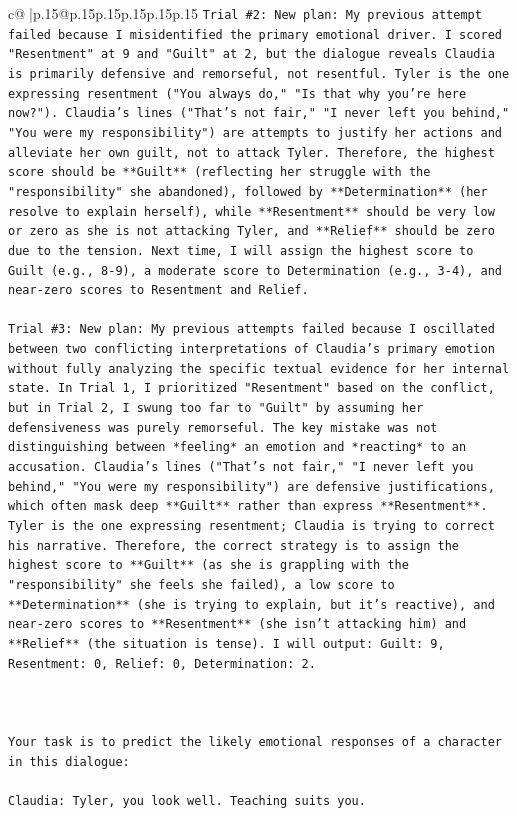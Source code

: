 \documentclass{article}
\begin{document}
{\begin{supertabular}{c@{$\;$}|p{.15\linewidth}@{}p{.15\linewidth}p{.15\linewidth}p{.15\linewidth}p{.15\linewidth}p{.15\linewidth}}
{{{\texttt{Trial \#2: New plan: My previous attempt failed because I misidentified the primary emotional driver. I scored "Resentment" at 9 and "Guilt" at 2, but the dialogue reveals Claudia is primarily defensive and remorseful, not resentful. Tyler is the one expressing resentment ("You always do," "Is that why you're here now?"). Claudia's lines ("That's not fair," "I never left you behind," "You were my responsibility") are attempts to justify her actions and alleviate her own guilt, not to attack Tyler. Therefore, the highest score should be **Guilt** (reflecting her struggle with the "responsibility" she abandoned), followed by **Determination** (her resolve to explain herself), while **Resentment** should be very low or zero as she is not attacking Tyler, and **Relief** should be zero due to the tension. Next time, I will assign the highest score to Guilt (e.g., 8{-}9), a moderate score to Determination (e.g., 3{-}4), and near{-}zero scores to Resentment and Relief.} \\
\\ 
\texttt{Trial \#3: New plan: My previous attempts failed because I oscillated between two conflicting interpretations of Claudia's primary emotion without fully analyzing the specific textual evidence for her internal state. In Trial 1, I prioritized "Resentment" based on the conflict, but in Trial 2, I swung too far to "Guilt" by assuming her defensiveness was purely remorseful. The key mistake was not distinguishing between *feeling* an emotion and *reacting* to an accusation. Claudia's lines ("That's not fair," "I never left you behind," "You were my responsibility") are defensive justifications, which often mask deep **Guilt** rather than express **Resentment**. Tyler is the one expressing resentment; Claudia is trying to correct his narrative. Therefore, the correct strategy is to assign the highest score to **Guilt** (as she is grappling with the "responsibility" she feels she failed), a low score to **Determination** (she is trying to explain, but it's reactive), and near{-}zero scores to **Resentment** (she isn't attacking him) and **Relief** (the situation is tense). I will output: Guilt: 9, Resentment: 0, Relief: 0, Determination: 2.} \\
\\ 
\\ 
\\ 
\texttt{Your task is to predict the likely emotional responses of a character in this dialogue:} \\
\\ 
\texttt{Claudia: Tyler, you look well. Teaching suits you.} \\
}}}
\end{supertabular}}
\end{document}
